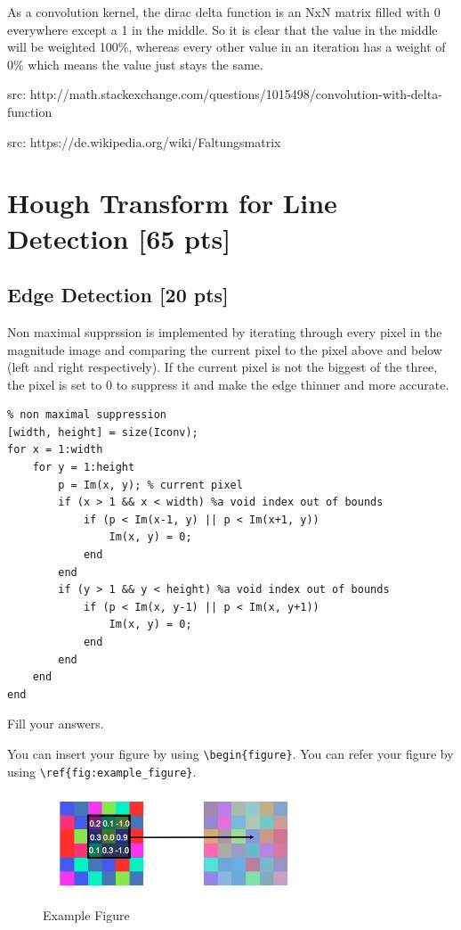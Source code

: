 \documentclass[12pt,a4paper]{article}
\begin{document}
As a convolution kernel, the dirac delta function is an NxN matrix filled with 0 everywhere except a 1 in the middle. So it is clear that the value in the middle will be weighted 100\%, whereas every other value in an iteration has a weight of 0\% which means the value just stays the same.


src: http://math.stackexchange.com/questions/1015498/convolution-with-delta-function

src: https://de.wikipedia.org/wiki/Faltungsmatrix


\section{Hough Transform for Line Detection [65 pts]}
\subsection{Edge Detection [20 pts]}
Non maximal supprssion is implemented by iterating through every pixel in the magnitude image and comparing the current pixel to the pixel above and below (left and right respectively). If the current pixel is not the biggest of the three, the pixel is set to 0 to suppress it and make the edge thinner and more accurate.

\begin{lstlisting}
% non maximal suppression
[width, height] = size(Iconv);
for x = 1:width
    for y = 1:height
        p = Im(x, y); % current pixel
        if (x > 1 && x < width) %a void index out of bounds
            if (p < Im(x-1, y) || p < Im(x+1, y))
                Im(x, y) = 0;
            end
        end
        if (y > 1 && y < height) %a void index out of bounds
            if (p < Im(x, y-1) || p < Im(x, y+1))
                Im(x, y) = 0;
            end
        end
    end
end
\end{lstlisting}







Fill your answers.

You can insert your figure by using \verb|\begin{figure}|.
You can refer your figure by using \verb|\ref{fig:example_figure}|.

\begin{figure}[!h]
    \begin{center}
        \includegraphics[width=0.7\textwidth]{assets/fig1.png}
        \caption{Example Figure}
        \label{fig:example_figure}
    \end{center}
\end{figure}
\end{document}
